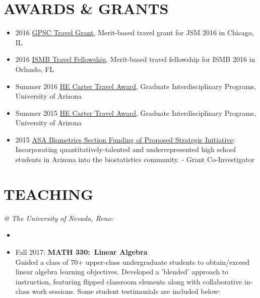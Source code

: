 \documentclass[paper=a4,fontsize=11pt]{scrartcl} %
\newcommand{\NewPart}[2]{\section*{\uppercase{#1} #2 }}
\newcommand{\CourseEntry}[3]{
		\noindent \item{#1: \textbf{#2} \\ #3}}
\begin{document}

\NewPart{Awards \& Grants}{}
\vspace{-7pt}
\begin{itemize}[noitemsep]
\item 2016 \href{http://gpsc.arizona.edu/travel-grants}{GPSC Travel Grant}, Merit-based travel grant for JSM 2016 in Chicago, IL
\item 2016 \href{https://www.iscb.org/ismb2016-submission/ismb2016-travel-fellowship-2}{ISMB Travel Fellowship}, Merit-based travel fellowship for ISMB 2016 in Orlando, FL
\item Summer 2016 \href{https://gidp.arizona.edu/carter-travel-award/award-recipients}{HE Carter Travel Award}, Graduate Interdisciplinary Programs, University of Arizona 
\item Summer 2015 \href{https://gidp.arizona.edu/carter-travel-award/award-recipients}{HE Carter Travel Award}, Graduate Interdisciplinary Programs, University of Arizona 
\item 2015 \href{http://stattrak.amstat.org/2014/03/01/grant-opportunity}{ASA Biometrics Section Funding of Proposed Strategic Initiative}:  Incorporating quantitatively-talented and underrepresented high school students in Arizona into the biostatistics community. - Grant Co-Investigator
\vspace{-7pt}
\end{itemize}

\NewPart{Teaching}{}
\vspace{-7pt}
\textit{@ The University of Nevada, Reno:}
\begin{itemize}[noitemsep]
\item[]
\vspace{-15pt}

\CourseEntry{Fall 2017}{MATH 330:~Linear Algebra}{Guided a class of 70+ upper-class undergraduate students to obtain/exceed linear algebra learning objectives. Developed a 'blended' approach to instruction, featuring flipped classroom elements along with collaborative in-class work sessions. Some student testimonials are included below:}{}

\end{itemize}
\end{document}
